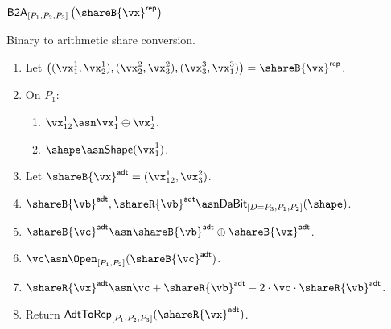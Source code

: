 
\msubsubsection
{$\mathsf{B2A}_{[P_1, P_2, P_3]} \left( \shareB{\vx}^\mathsf{rep} \right)$}
  \label{fig:b2a-protocol}

  Binary to arithmetic share conversion.

  \begin{enumerate}
  \item Let $\left( (\vx_1^1, \vx_2^1), (\vx_2^2, \vx_3^2), (\vx_3^3, \vx_1^3) \right) = \shareB{\vx}^\mathsf{rep}$.
  \item On $P_1$:
  \begin{enumerate}
  \item $\vx^1_{12} \asn \vx_1^1 \oplus \vx_2^1$.
  \item $\shape \asn \mathsf{Shape}(\vx^1_1)$.
  \end{enumerate}
  \item Let $\shareB{\vx}^\mathsf{adt} = (\vx^1_{12}, \vx_3^2)$.
  \item $\shareB{\vb}^\mathsf{adt}, \shareR{\vb}^\mathsf{adt} \asn \textsf{DaBit}_{[D=P_3, P_1, P_2]}(\shape)$.
  \item $\shareB{\vc}^{\mathsf{adt}} \asn \shareB{\vb}^\mathsf{adt} \oplus \shareB{\vx}^{\mathsf{adt}}$.
  \item $\vc \asn \Open_{[P_1, P_2]}(\shareB{\vc}^{\mathsf{adt}})$.
  \item $\shareR{\vx}^\mathsf{adt} \asn \vc + \shareR{\vb}^{\mathsf{adt}} - 2 \cdot \vc \cdot \shareR{\vb}^{\mathsf{adt}}$.
  \item Return $\textsf{AdtToRep}_{[P_1,P_2,P_3]}(\shareR{\vx}^\mathsf{adt})$.
\end{enumerate}

